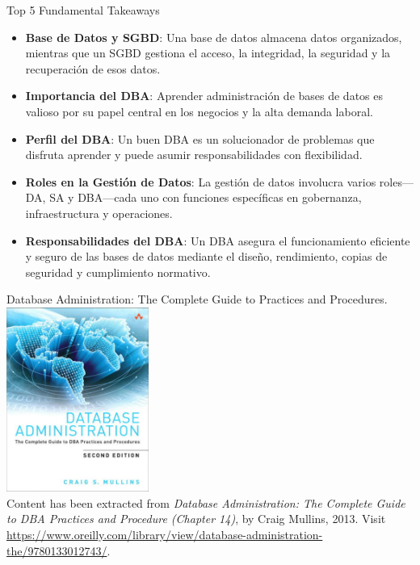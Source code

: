 \documentclass{beamer}
\begin{document}
\begin{frame}{Top 5 Fundamental Takeaways}
    \begin{itemize} \pause
        \small
        \item[5] \textbf{Base de Datos y SGBD}: Una base de datos almacena datos organizados, mientras que un SGBD gestiona el acceso, la integridad, la seguridad y la recuperación de esos datos.\pause


        \item[4] \textbf{Importancia del DBA}: Aprender administración de bases de datos es valioso por su papel central en los negocios y la alta demanda laboral.\pause


        \item[3] \textbf{Perfil del DBA}: Un buen DBA es un solucionador de problemas que disfruta aprender y puede asumir responsabilidades con flexibilidad.\pause


        \item[2] \textbf{Roles en la Gestión de Datos}: La gestión de datos involucra varios roles—DA, SA y DBA—cada uno con funciones específicas en gobernanza, infraestructura y operaciones.\pause


        \item[1] \textbf{Responsabilidades del DBA}: Un DBA asegura el funcionamiento eficiente y seguro de las bases de datos mediante el diseño, rendimiento, copias de seguridad y cumplimiento normativo.
    \end{itemize}
\end{frame}

\begin{frame}{Database Administration: The Complete Guide to Practices and Procedures.}
    \centering
    \includegraphics[width=0.35\textwidth]{figures/book_cover}\\
    \vspace{2mm}
    {
        \scriptsize
        Content has been extracted from \textit{Database Administration: The Complete Guide to DBA Practices and Procedure (Chapter 14)}, by Craig Mullins, 2013.  Visit \url{https://www.oreilly.com/library/view/database-administration-the/9780133012743/}.
    }
\end{frame}
\end{document}
